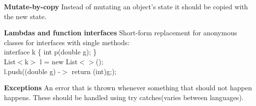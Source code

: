 \documentclass{article}
\begin{document}
\begin{Parallel}[v]{0.49\textwidth}{0.49\textwidth}
{        \textbf{Mutate-by-copy}\newline
        Instead of mutating an object's state it should be copied with the new state.

        \textbf{Lambdas and function interfaces}\newline
        Short-form replacement for anonymous classes for interfaces with single methods:\\
        interface k \{
        int p(double g);
        \}\\
        List$<$k$>$ l = new List$<>$();\\
        l.push((double g) -$>$ {return (int)g;});

        \textbf{Exceptions}\newline
        An error that is thrown whenever something that should not happen happens.
        These should be handled using try catches(varies between languages).
    }
    \ParallelPar
\end{Parallel}
\end{document}
